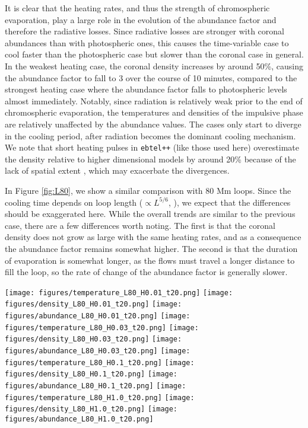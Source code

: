 \documentclass[twocolumn]{aastex631}
\begin{document}
It is clear that the heating rates, and thus the strength of chromospheric evaporation, play a large role in the evolution of the abundance factor and therefore the radiative losses.  Since radiative losses are stronger with coronal abundances than with photospheric ones, this causes the time-variable case to cool faster than the photospheric case but slower than the coronal case in general.  In the weakest heating case, the coronal density increases by around 50\%, causing the abundance factor to fall to 3 over the course of 10 minutes, compared to the strongest heating case where the abundance factor falls to photospheric levels almost immediately.  Notably, since radiation is relatively weak prior to the end of chromospheric evaporation, the temperatures and densities of the impulsive phase are relatively unaffected by the abundance values.  The cases only start to diverge in the cooling period, after radiation becomes the dominant cooling mechanism.  We note that short heating pulses in \texttt{ebtel++} (like those used here) overestimate the density relative to higher dimensional models by around 20\% because of the lack of spatial extent \citep{barnes2016}, which may exacerbate the divergences.


In Figure \ref{fig:L80}, we show a similar comparison with 80 Mm loops.  Since the cooling time depends on loop length ($\propto L^{5/6}$, \citealt{cargill1995}), we expect that the differences should be exaggerated here.  While the overall trends are similar to the previous case, there are a few differences worth noting.  The first is that the coronal density does not grow as large with the same heating rates, and as a consequence the abundance factor remains somewhat higher.  The second is that the duration of evaporation is somewhat longer, as the flows must travel a longer distance to fill the loop, so the rate of change of the abundance factor is generally slower.  
\begin{figure*}
    \centering
    \texttt{[image: figures/temperature\_L80\_H0.01\_t20.png]}
    \texttt{[image: figures/density\_L80\_H0.01\_t20.png]}
    \texttt{[image: figures/abundance\_L80\_H0.01\_t20.png]}
    \texttt{[image: figures/temperature\_L80\_H0.03\_t20.png]}
    \texttt{[image: figures/density\_L80\_H0.03\_t20.png]}
    \texttt{[image: figures/abundance\_L80\_H0.03\_t20.png]}
    \texttt{[image: figures/temperature\_L80\_H0.1\_t20.png]}
    \texttt{[image: figures/density\_L80\_H0.1\_t20.png]}
    \texttt{[image: figures/abundance\_L80\_H0.1\_t20.png]}
    \texttt{[image: figures/temperature\_L80\_H1.0\_t20.png]}
    \texttt{[image: figures/density\_L80\_H1.0\_t20.png]}
    \texttt{[image: figures/abundance\_L80\_H1.0\_t20.png]}
    \caption{Similar to Figure \ref{fig:L40}, showing the results for an 80 Mm loop heated impulsively for 20 s.  \label{fig:L80}}
\end{figure*}
\end{document}
